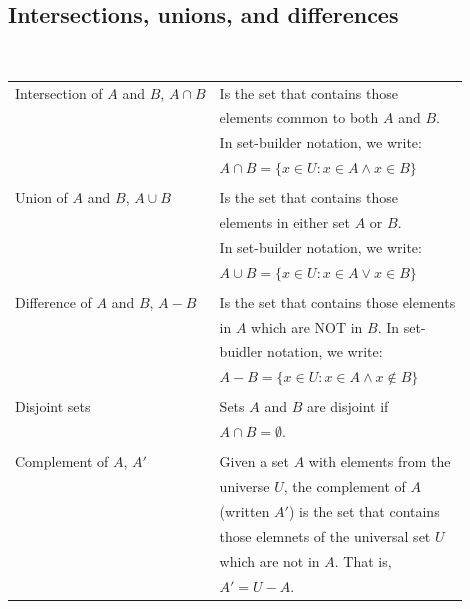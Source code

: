 \documentclass[a4paper,12pt]{book}
\begin{document}
        \newpage

        \subsection{Intersections, unions, and differences}

        \begin{intro}{\ }
            \begin{tabular}{l l}
                Intersection of $A$ and $B$, $A \cap B$ &
                    Is the set that contains those \\ &
                    elements common to both $A$ and $B$. \\ &
                    In set-builder notation, we write: \\ &
                    $A \cap B = \{ x \in U : x \in A \land x \in B \}$
                    \\
                \\
                Union of $A$ and $B$, $A \cup B$ &
                    Is the set that contains those \\ &
                    elements in either set $A$ or $B$. \\ &
                    In set-builder notation, we write: \\ &
                    $A \cup B = \{ x \in U: x \in A \lor x \in B \}$
                    \\
                \\
                Difference of $A$ and $B$, $A - B$ &
                    Is the set that contains those elements \\ &
                    in $A$ which are NOT in $B$. In set- \\&
                    buidler notation, we write: \\ &
                    $A - B = \{ x \in U : x \in A \land x \not\in B \}$
                    \\
                \\
                Disjoint sets &
                    Sets $A$ and $B$ are disjoint if \\ &
                    $A \cap B = \emptyset$.
                \\ \\
                Complement of $A$, $A'$ &
                    Given a set $A$ with elements from the \\ &
                    universe $U$, the complement of $A$ \\ &
                    (written $A'$) is the set that contains \\ &
                    those elemnets of the universal set $U$ \\ &
                    which are not in $A$. That is, \\ &
                    $A' = U-A$.
                    \\
            \end{tabular}


\end{intro}
\end{document}
